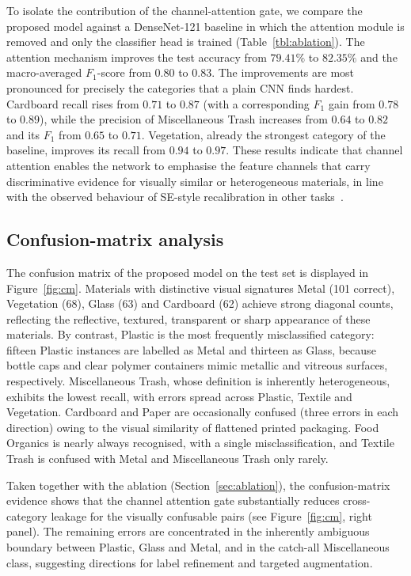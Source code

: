 \documentclass[a4paper,fleqn]{cas-dc}
\begin{document}
To isolate the contribution of the channel-attention gate, we compare the
proposed model against a DenseNet-121 baseline in which the attention module
is removed and only the classifier head is trained (Table~\ref{tbl:ablation}).
The attention mechanism improves the test
accuracy from $79.41\%$ to $82.35\%$ and the macro-averaged $F_1$-score from
$0.80$ to $0.83$. The improvements are most pronounced for precisely the
categories that a plain CNN finds hardest. Cardboard recall rises from
$0.71$ to $0.87$ (with a corresponding $F_1$ gain from $0.78$ to $0.89$),
while the precision of Miscellaneous Trash increases from $0.64$ to $0.82$
and its $F_1$ from $0.65$ to $0.71$. Vegetation, already the strongest
category of the baseline, improves its recall from $0.94$ to $0.97$. These
results indicate that channel attention enables the network to emphasise the
feature channels that carry discriminative evidence for visually similar or
heterogeneous materials, in line with the observed behaviour of SE-style
recalibration in other tasks~\cite{hu_senet,woo_cbam}.

\subsection{Confusion-matrix analysis}\label{sec:confusion}

The confusion matrix of the proposed model on the test set is displayed in
Figure~\ref{fig:cm}. Materials with distinctive visual signatures Metal
(101 correct), Vegetation (68), Glass (63) and Cardboard (62) achieve strong
diagonal counts, reflecting the reflective, textured, transparent or sharp
appearance of these materials. By contrast, Plastic is the most frequently
misclassified category: fifteen Plastic instances are labelled as Metal and
thirteen as Glass, because bottle caps and clear polymer containers mimic
metallic and vitreous surfaces, respectively. Miscellaneous Trash, whose
definition is inherently heterogeneous, exhibits the lowest recall, with
errors spread across Plastic, Textile and Vegetation. Cardboard and Paper are
occasionally confused (three errors in each direction) owing to the visual
similarity of flattened printed packaging. Food Organics is nearly always
recognised, with a single misclassification, and Textile Trash is confused
with Metal and Miscellaneous Trash only rarely.

Taken together with the ablation (Section~\ref{sec:ablation}), the
confusion-matrix evidence shows that the channel attention gate substantially
reduces cross-category leakage for the visually confusable pairs (see
Figure~\ref{fig:cm}, right panel). The remaining errors are concentrated in
the inherently ambiguous boundary between Plastic, Glass and Metal, and in
the catch-all Miscellaneous class, suggesting directions for label
refinement and targeted augmentation.
\end{document}
